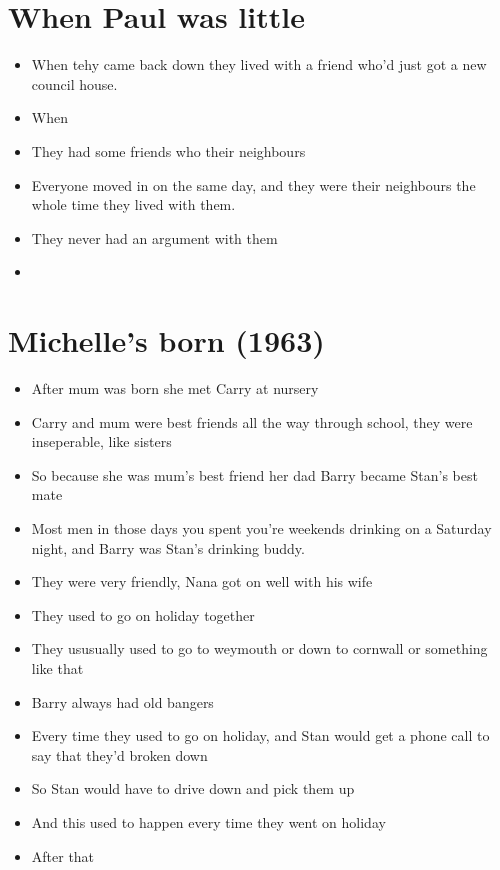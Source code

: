 \documentclass[10pt,twocolumn,letterpaper]{article}
\begin{document}
\section{When Paul was little}
\begin{itemize}
    \item When tehy came back down they lived with a friend who'd just got a new council house.
    \item When
    \item They had some friends who their neighbours
    \item Everyone moved in on the same day, and they were their neighbours the whole time they lived with them.
    \item They never had an argument with them
    \item 
\end{itemize}


\section{Michelle's born (1963)}
\begin{itemize}
    \item After mum was born she met Carry at nursery
    \item Carry and mum were best friends all the way through school, they were inseperable, like sisters
    \item So because she was mum's best friend her dad Barry became Stan's best mate
    \item Most men in those days you spent you're weekends drinking on a Saturday night, and Barry was Stan's drinking buddy.
    \item They were very friendly, Nana got on well with his wife
    \item They used to go on holiday together
    \item They ususually used to go to weymouth or down to cornwall or something like that
    \item Barry always had old bangers
    \item Every time they used to go on holiday, and Stan would get a phone call to say that they'd broken down
    \item So Stan would have to drive down and pick them up
    \item And this used to happen every time they went on holiday
    \item After that
\end{itemize}
\end{document}
